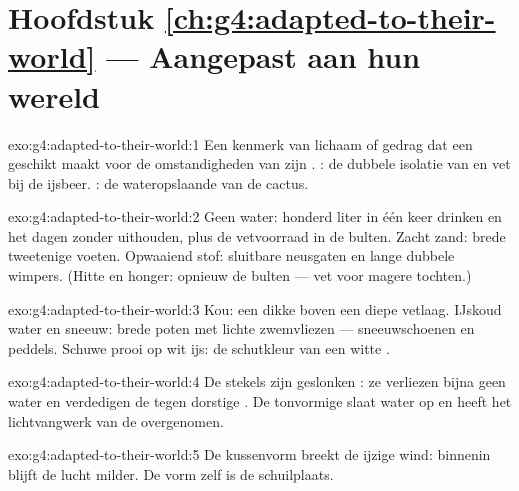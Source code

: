\section*{Hoofdstuk \ref{ch:g4:adapted-to-their-world} --- Aangepast aan hun wereld}

\begin{solution}{exo:g4:adapted-to-their-world:1}
Een kenmerk van lichaam of gedrag dat een  geschikt maakt
voor de omstandigheden van zijn . : de dubbele isolatie
van  en vet bij de ijsbeer. : de wateropslaande  van de
cactus.
\end{solution}

\begin{solution}{exo:g4:adapted-to-their-world:2}
Geen water: honderd liter in één keer drinken en het dagen zonder
uithouden, plus de vetvoorraad in de bulten. Zacht zand: brede
tweetenige voeten. Opwaaiend stof: sluitbare neusgaten en lange dubbele
wimpers. (Hitte en honger: opnieuw de bulten --- vet voor magere tochten.)
\end{solution}

\begin{solution}{exo:g4:adapted-to-their-world:3}
Kou: een dikke  boven een diepe vetlaag. IJskoud water en sneeuw:
brede poten met lichte zwemvliezen --- sneeuwschoenen en peddels.
Schuwe prooi op wit ijs: de schutkleur van een witte .
\end{solution}

\begin{solution}{exo:g4:adapted-to-their-world:4}
De stekels zijn geslonken : ze verliezen bijna geen water en
verdedigen de  tegen dorstige . De tonvormige  slaat
water op en heeft het lichtvangwerk van de  overgenomen.
\end{solution}

\begin{solution}{exo:g4:adapted-to-their-world:5}
De kussenvorm breekt de ijzige wind: binnenin blijft de lucht milder. De
vorm zelf is de schuilplaats.
\end{solution}

